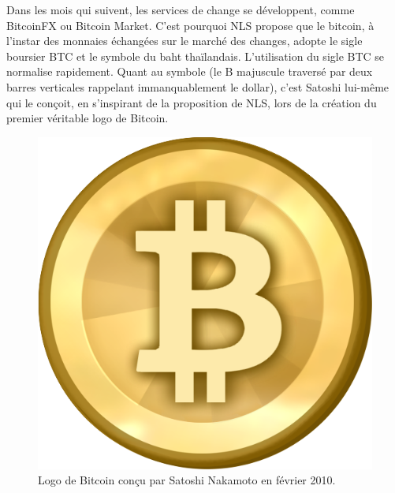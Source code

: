 Dans les mois qui suivent, les services de change se développent, comme BitcoinFX ou Bitcoin Market. C'est pourquoi NLS propose que le bitcoin, à l'instar des monnaies échangées sur le marché des changes, adopte le sigle boursier BTC et le symbole du baht thaïlandais. L'utilisation du sigle BTC se normalise rapidement. Quant au symbole (le B majuscule traversé par deux barres verticales rappelant immanquablement le dollar), c'est Satoshi lui-même qui le conçoit, en s'inspirant de la proposition de NLS, lors de la création du premier véritable logo de Bitcoin.

\begin{figure}[h]
  \centering
  \includegraphics[scale=0.15]{img/bitcoin530.png}
  \caption{Logo de Bitcoin conçu par Satoshi Nakamoto en février 2010.}
\end{figure}

